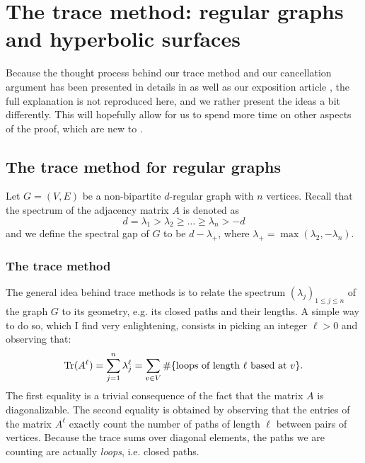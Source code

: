 \documentclass[12pt,twoside]{article}
\theoremstyle{theorem}
\theoremstyle{remark}
\theoremstyle{definition}
\theoremstyle{example}
\def\Tr{{\rm Tr}}
\newcommand{\1}[1]{\mathds{1}_{#1}}
\begin{document}
\section{The trace method: regular graphs and hyperbolic surfaces}
\label{sec:trace}

Because the thought process behind our trace method and our cancellation argument has been presented
in details in \cite{anantharaman2023} as well as our exposition article \cite{anantharaman2024}, the
full explanation is not reproduced here, and we rather present the ideas a bit differently.
This will hopefully allow for us to spend more time on other aspects of the proof, which are new to
\cite{anantharaman2025}. 

\subsection{The trace method for regular graphs}
\label{sec:baby-trace-method}

Let $G = (V,E)$ be a non-bipartite $d$-regular graph with $n$ vertices. Recall that the spectrum of
the adjacency matrix $A$ is denoted as
\begin{equation}
  \label{eq:sp_G}
  d = \lambda_1 > \lambda_2 \geq \ldots \geq \lambda_n > -d
\end{equation}
and we define the spectral gap of $G$ to be $d-\lambda_+$, where
$\lambda_+=\max(\lambda_2,-\lambda_n)$.

\subsubsection{The trace method}
\label{sec:simple-trace-method}

The general idea behind trace methods is to relate the spectrum $(\lambda_j)_{1 \leq j \leq n}$ of
the graph $G$ to its geometry, e.g. its closed paths and their lengths. A simple way to do so, which
I find very enlightening, consists in picking an integer $\ell > 0$ and observing that:
\begin{equation}
  \label{eq:tr_G}
  \Tr(A^\ell) = \sum_{j=1}^n \lambda_j^\ell
  = \sum_{v \in V} \# \{\text{loops of length } \ell \text{ based at } v\}.
\end{equation}
The first equality is a trivial consequence of the fact that the matrix $A$ is diagonalizable.
The second equality is obtained by observing that the entries of the matrix $A^\ell$ exactly count
the number of paths of length $\ell$ between pairs of vertices. Because the trace sums over diagonal
elements, the paths we are counting are actually \emph{loops}, i.e. closed paths.
\end{document}
